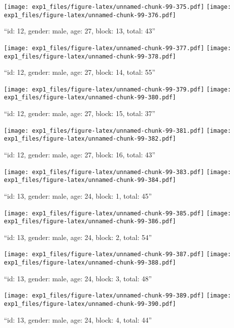 \documentclass[,]{article}
\begin{document}
\texttt{[image: exp1\_files/figure-latex/unnamed-chunk-99-375.pdf]}
\texttt{[image: exp1\_files/figure-latex/unnamed-chunk-99-376.pdf]}

\newpage
[1] 

``id: 12, gender: male, age: 27, block: 13, total: 43''

\texttt{[image: exp1\_files/figure-latex/unnamed-chunk-99-377.pdf]}
\texttt{[image: exp1\_files/figure-latex/unnamed-chunk-99-378.pdf]}

\newpage
[1] 

``id: 12, gender: male, age: 27, block: 14, total: 55''

\texttt{[image: exp1\_files/figure-latex/unnamed-chunk-99-379.pdf]}
\texttt{[image: exp1\_files/figure-latex/unnamed-chunk-99-380.pdf]}

\newpage
[1] 

``id: 12, gender: male, age: 27, block: 15, total: 37''

\texttt{[image: exp1\_files/figure-latex/unnamed-chunk-99-381.pdf]}
\texttt{[image: exp1\_files/figure-latex/unnamed-chunk-99-382.pdf]}

\newpage
[1] 

``id: 12, gender: male, age: 27, block: 16, total: 43''

\texttt{[image: exp1\_files/figure-latex/unnamed-chunk-99-383.pdf]}
\texttt{[image: exp1\_files/figure-latex/unnamed-chunk-99-384.pdf]}

\newpage
[1] 

``id: 13, gender: male, age: 24, block: 1, total: 45''

\texttt{[image: exp1\_files/figure-latex/unnamed-chunk-99-385.pdf]}
\texttt{[image: exp1\_files/figure-latex/unnamed-chunk-99-386.pdf]}

\newpage
[1] 

``id: 13, gender: male, age: 24, block: 2, total: 54''

\texttt{[image: exp1\_files/figure-latex/unnamed-chunk-99-387.pdf]}
\texttt{[image: exp1\_files/figure-latex/unnamed-chunk-99-388.pdf]}

\newpage
[1] 

``id: 13, gender: male, age: 24, block: 3, total: 48''

\texttt{[image: exp1\_files/figure-latex/unnamed-chunk-99-389.pdf]}
\texttt{[image: exp1\_files/figure-latex/unnamed-chunk-99-390.pdf]}

\newpage
[1] 

``id: 13, gender: male, age: 24, block: 4, total: 44''
\end{document}

